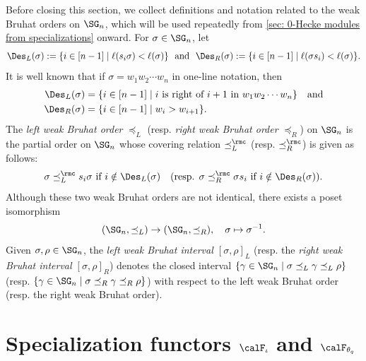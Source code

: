\documentclass[12pt, reqno]{amsart}
\theoremstyle{plain}
\theoremstyle{definition}
\numberwithin{equation}{section}
\numberwithin{figure}{section}
\numberwithin{table}{section}
\begin{document}
\bigskip 
Before closing this section, we collect definitions and notation related to the weak Bruhat orders on $\SG_n$, which will be used repeatedly from \cref{sec: 0-Hecke modules from specializations} onward.
For $\sigma \in \SG_n$, let
\[
\Des_L(\sigma):= \{i \in [n-1] \mid \ell(s_i \sigma) < \ell(\sigma)\}
\ \  \text{and} \ \  
\Des_R(\sigma):= \{i \in [n-1] \mid \ell(\sigma s_i) < \ell(\sigma)\}.
\]
It is well known that if $\sigma = w_1 w_2 \cdots w_n$ in one-line notation, then
\begin{align*}
\begin{aligned}
\Des_L(\sigma) & = \{ i \in [n-1] \mid \text{$i$ is right of $i+1$ in $w_1 w_2 \cdots w_n$} \} \quad \text{and} \\
\Des_R(\sigma) & = \{ i \in [n-1] \mid w_i > w_{i+1}
\}.
\end{aligned} 
\end{align*}
The \emph{left weak Bruhat order} $\preceq_L$ 
(resp. \emph{right weak Bruhat order} $\preceq_R$) on $\SG_n$
is the partial order on $\SG_n$ whose covering relation $\preceq_L^{\rmc}$ (resp. $\preceq_R^\rmc$) is given as follows: 
\[
\sigma \preceq_L^\rmc s_i \sigma \text{ if }i \notin \Des_L(\sigma)
\quad \text{(resp. $\sigma \preceq_R^\rmc \sigma s_i$ if  $i \notin \Des_R(\sigma)$).}
\]
Although these two weak Bruhat orders are not identical,  
there exists a poset isomorphism $$(\SG_n, \preceq_L)\to (\SG_n, \preceq_R),\quad \sigma \mapsto \sigma^{-1}.$$
Given $\sigma, \rho \in \SG_n$, the \emph{left weak Bruhat interval $[\sigma, \rho]_L$} (resp. the \emph{right weak Bruhat interval $[\sigma, \rho]_R$}) denotes the closed interval $\{\gamma \in \SG_n \mid \sigma \preceq_L \gamma \preceq_L \rho \}$ (resp. $\{\gamma \in \SG_n \mid \sigma \preceq_R \gamma \preceq_R \rho \}$) with respect to the left weak Bruhat order (resp. the right weak Bruhat order).


\section{Specialization functors
\texorpdfstring{$\calF_\iota$ and $\calF_{\theta_q}$}
{F iota and F theta q}}
\label{sec: specialization functor}
\end{document}
